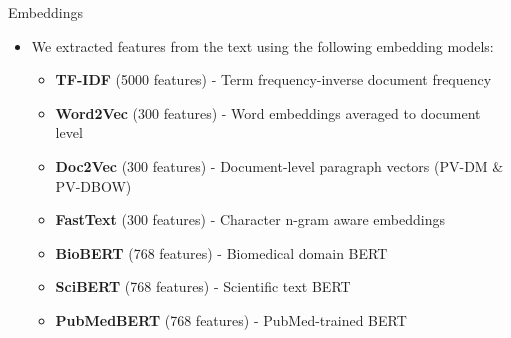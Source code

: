 \documentclass[
    10pt,
    aspectratio=169,
]{beamer}
\begin{document}
\begin{frame}{Embeddings}
\begin{itemize}
    \item We extracted features from the text using the following embedding models:
    \begin{itemize}
        \item \textbf{TF-IDF} (5000 features) - Term frequency-inverse document frequency
        \item \textbf{Word2Vec} (300 features) - Word embeddings averaged to document level
        \item \textbf{Doc2Vec} (300 features) - Document-level paragraph vectors (PV-DM \& PV-DBOW)
        \item \textbf{FastText} (300 features) - Character n-gram aware embeddings
        \item \textbf{BioBERT} (768 features) - Biomedical domain BERT
        \item \textbf{SciBERT} (768 features) - Scientific text BERT
        \item \textbf{PubMedBERT} (768 features) - PubMed-trained BERT
    \end{itemize}
\end{itemize}
\end{frame}
\end{document}
